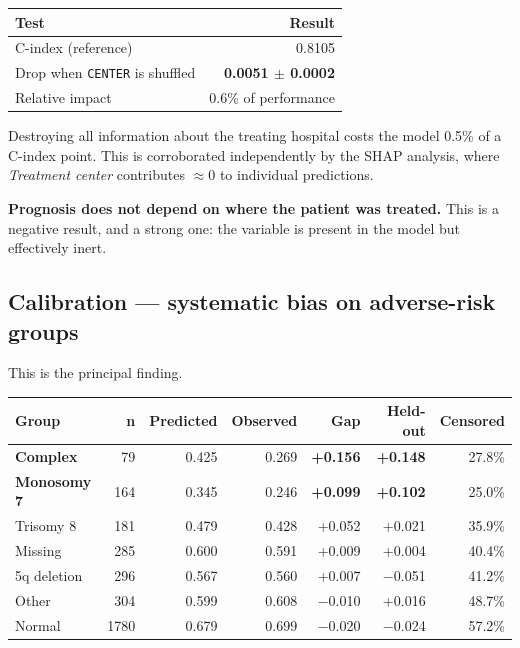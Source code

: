 \documentclass[11pt,a4paper]{article}
\newcommand{\var}[1]{\texttt{#1}}                      %
\newcommand{\bad}[1]{\textcolor{warnred}{\textbf{#1}}} %
\newcommand{\good}[1]{\textcolor{okgreen}{\textbf{#1}}}%
\begin{document}
\begin{table}[h]
\centering
\begin{tabular}{@{}lr@{}}
\toprule
\textbf{Test} & \textbf{Result} \\
\midrule
C-index (reference)                & 0.8105 \\
Drop when \var{CENTER} is shuffled & \good{0.0051 $\pm$ 0.0002} \\
Relative impact                    & 0.6\% of performance \\
\bottomrule
\end{tabular}
\end{table}

Destroying all information about the treating hospital costs the model 0.5\% of a C-index
point. This is corroborated independently by the SHAP analysis, where \emph{Treatment center}
contributes $\approx 0$ to individual predictions.

\begin{keybox}
\good{Prognosis does not depend on where the patient was treated.} This is a negative result,
and a strong one: the variable is present in the model but effectively inert.
\end{keybox}

\subsection{Calibration --- systematic bias on adverse-risk groups}

This is the principal finding.

\begin{table}[h]
\centering
\small
\begin{tabular}{@{}lrrrrrr@{}}
\toprule
\textbf{Group} & \textbf{n} & \textbf{Predicted} & \textbf{Observed} & \textbf{Gap} &
\textbf{Held-out} & \textbf{Censored} \\
\midrule
\bad{Complex}    &   79 & 0.425 & 0.269 & \bad{+0.156} & \bad{+0.148} & 27.8\% \\
\bad{Monosomy 7} &  164 & 0.345 & 0.246 & \bad{+0.099} & \bad{+0.102} & 25.0\% \\
Trisomy 8        &  181 & 0.479 & 0.428 & +0.052 & +0.021 & 35.9\% \\
Missing          &  285 & 0.600 & 0.591 & +0.009 & +0.004 & 40.4\% \\
5q deletion      &  296 & 0.567 & 0.560 & +0.007 & $-$0.051 & 41.2\% \\
Other            &  304 & 0.599 & 0.608 & $-$0.010 & +0.016 & 48.7\% \\
Normal           & 1780 & 0.679 & 0.699 & $-$0.020 & $-$0.024 & 57.2\% \\
\bottomrule
\end{tabular}
\end{table}
\end{document}
